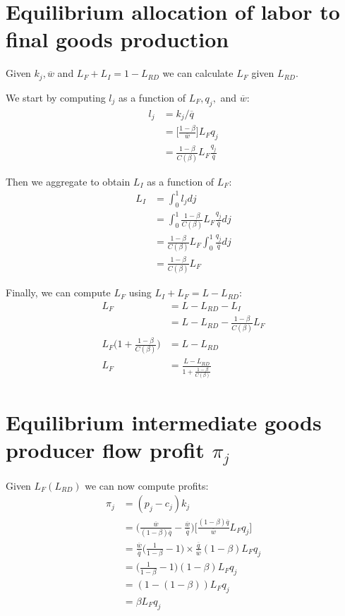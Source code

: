 \documentclass[12pt,english]{article}
\theoremstyle{remark}
\begin{document}
\section{Equilibrium allocation of labor to final goods production}
Given $k_j,\overline{w}$ and $L_F + L_I  = 1 - L_{RD}$ we can calculate $L_F$ given $L_{RD}$. 

We start by computing $l_j$ as a function of $L_F, q_j,$ and $\overline{w}$:
\begin{align*}
	l_j &= k_j / \overline{q} \\
		&=  \Big[ \frac{1-\beta}{\overline{w}} \Big]L_F   q_j \\
		&= \frac{1-\beta}{C(\beta)} L_F \frac{q_j}{\overline{q}}
\end{align*}

Then we aggregate to obtain $L_I$ as a function of $L_F$:
\begin{align*}
	L_I &= \int_0^1 l_j dj \\
	    &= \int_0^1 \frac{1-\beta}{C(\beta)} L_F \frac{q_j}{\overline{q}} dj \\
	    &= \frac{1-\beta}{C(\beta)} L_F \int_0^1 \frac{q_j}{\overline{q}} dj \\
	    &= \frac{1-\beta}{C(\beta)} L_F 
\end{align*}

Finally, we can compute $L_F$ using $L_I + L_F = L - L_{RD}$: 
\begin{align*}
	L_F &= L - L_{RD} - L_I \\
	    &= L - L_{RD} - \frac{1-\beta}{C(\beta)} L_F \\
	L_F \Big( 1 +  \frac{1-\beta}{C(\beta)} \Big) &= L - L_{RD} \\
	L_F &= \frac{L - L_{RD}}{1 +  \frac{1-\beta}{C(\beta)}}
\end{align*}

\section{Equilibrium intermediate goods producer flow profit $\pi_j$}

Given $L_F(L_{RD})$ we can now compute profits:
\begin{align*}
	\pi_j &= (p_j - c_j) k_j \\
	      &= \Big( \frac{\overline{w}}{(1-\beta)\overline{q}} - \frac{\overline{w}}{\overline{q}} \Big) \Big[ \frac{(1-\beta) \overline{q}}{\overline{w}} L_F q_j  \Big] \\
	      &= \frac{\overline{w}}{\overline{q}} \Big( \frac{1}{1-\beta} - 1 \Big) \times \frac{\overline{q}}{\overline{w}} (1-\beta) L_F q_j \\
	      &= \Big( \frac{1}{1-\beta} - 1 \Big) (1-\beta) L_F q_j \\
	      &= (1 - (1-\beta)) L_F q_j \\
	      &= \beta L_F q_j 
\end{align*}
\end{document}
